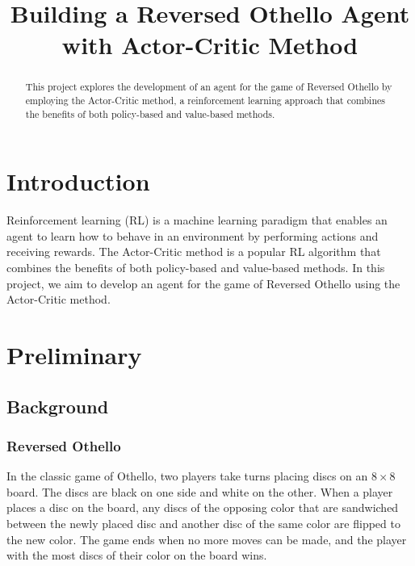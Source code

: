 \documentclass[conference]{IEEEtran}
\begin{document}
\title{Building a Reversed Othello Agent with Actor-Critic Method}

\author{
}

\maketitle

\begin{abstract}
This project explores the development of an agent for the game of Reversed Othello by employing the Actor-Critic method, a reinforcement learning approach that combines the benefits of both policy-based and value-based methods.
\end{abstract}

\section{Introduction}
Reinforcement learning (RL) is a machine learning paradigm that enables an agent to learn how to behave in an environment by performing actions and receiving rewards. 
The Actor-Critic method is a popular RL algorithm that combines the benefits of both policy-based and value-based methods. 
In this project, we aim to develop an agent for the game of Reversed Othello using the Actor-Critic method.

\section{Preliminary}

\subsection{Background}

\subsubsection{Reversed Othello}
In the classic game of Othello, two players take turns placing discs on an $8 \times 8$ board.
The discs are black on one side and white on the other.
When a player places a disc on the board, any discs of the opposing color that are sandwiched between the newly placed disc and another disc of the same color are flipped to the new color.
The game ends when no more moves can be made, and the player with the most discs of their color on the board wins.
\end{document}

